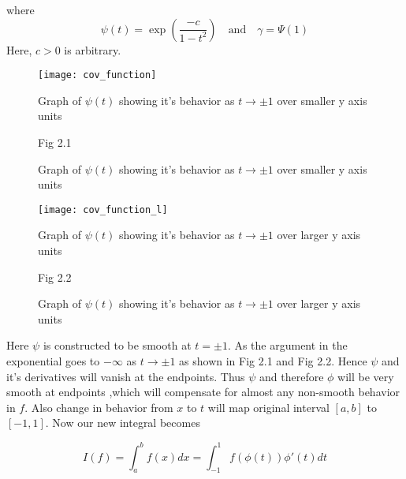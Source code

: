 \documentclass[../document.tex]{subfiles}
\begin{document}
	where
	$$
	\psi(t) = \exp \left( \frac{-c}{1 - t^2} \right) \quad \textrm{and} \quad \gamma = \Psi(1)
	$$
	Here, $c>0$ is arbitrary.
	\begin{figure}[h] \label{plot1}
		\texttt{[image: cov\_function]}
		\centering	
		\begin{center}
			Graph of $\psi(t)$ showing it's behavior as $t\rightarrow \pm1$ over smaller y axis units
			
			\vspace{1mm}
			
			Fig  2.1
		\end{center}
		\caption{Graph of $\psi(t)$ showing it's behavior as $t\rightarrow \pm1$ over smaller y axis units}		
	\end{figure}
	
	\begin{figure}[h] \label{plot2}
		\texttt{[image: cov\_function\_l]}
		\centering	
		\begin{center}
			Graph of $\psi(t)$ showing it's behavior as $t\rightarrow \pm1$ over larger y axis units
			
			\vspace{1mm}
			
			Fig  2.2
		\end{center}
		\caption{Graph of $\psi(t)$ showing it's behavior as $t\rightarrow \pm1$ over larger y axis units}		
	\end{figure}	
	
	
	Here $\psi$ is constructed to be smooth at $t=\pm1$. 
	As the argument in the exponential goes to $-\infty$ as $t \rightarrow \pm1$ as shown in Fig 2.1 and Fig 2.2. Hence $\psi$ and it's derivatives will vanish at the endpoints. Thus $\psi$ and therefore 
	$\phi $ will be very smooth at endpoints ,which will compensate for almost any non-smooth behavior in $f$. Also change in behavior from $x$ to $t$ will map original interval $[a,b]$ to $[-1,1]$. Now our new integral becomes
	
	\begin{equation}  \label{Change-of-variable-2}
		I(f) = \int_{a}^{b}f(x)dx = \int_{-1}^{1} f(\phi(t)) \phi'(t)dt
	\end{equation}
	
\end{document}
